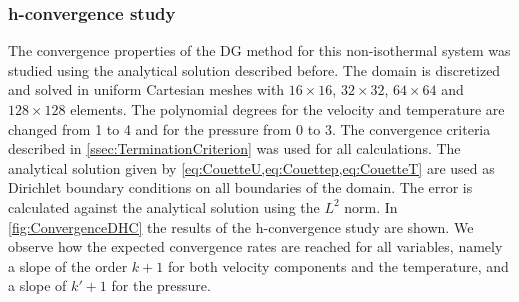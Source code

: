 \subsubsection{h-convergence study}
The convergence properties of the DG method for this non-isothermal system was studied using the analytical solution described before. The domain is discretized and solved in uniform Cartesian meshes with $16\times16$, $32\times32$, $64\times64$ and $128\times128$ elements. The polynomial degrees for the velocity and temperature are changed from 1 to 4 and for the pressure from 0 to 3. The convergence criteria described in \cref{ssec:TerminationCriterion} was used for all calculations. The  analytical solution given by \cref{eq:CouetteU,eq:Couettep,eq:CouetteT} are used as Dirichlet boundary conditions on all boundaries of the domain. The error is calculated against the analytical solution using the $L^2$ norm. %
In \cref{fig:ConvergenceDHC} the results of the h-convergence study are shown. We observe how the expected convergence rates are reached for all variables, namely a slope of the order $k+1$ for both velocity components and the temperature, and a slope of $k'+1$ for the pressure.
